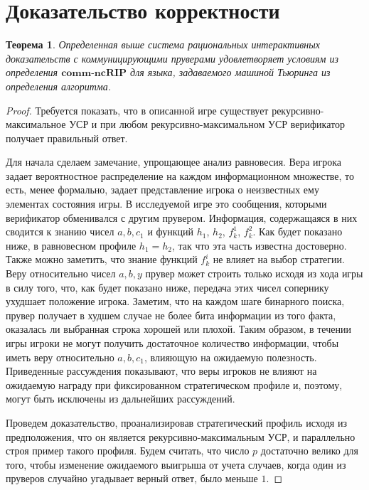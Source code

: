 \documentclass[14pt, a4paper]{extreport}
\newtheorem{theorem}{\indent Теорема}
\begin{document}
        \section{Доказательство корректности}
        \begin{theorem}Определенная выше система рациональных интерактивных доказательств с коммуницирующими пруверами удовлетворяет условиям из определения $\textbf{comm-ncRIP}$ для языка, задаваемого машиной Тьюринга из определения алгоритма.\end{theorem}
        \begin{proof}Требуется показать, что в описанной игре существует рекурсивно-максимальное УСР и при любом рекурсивно-максимальном УСР верификатор получает правильный ответ.

            Для начала сделаем замечание, упрощающее анализ равновесия. Вера игрока задает вероятностное распределение на каждом информационном множестве, то есть, менее формально, задает представление игрока о неизвестных ему элементах состояния игры. В исследуемой игре это сообщения, которыми верификатор обменивался с другим прувером. Информация, содержащаяся в них сводится к знанию чисел $a, b, c_1$ и функций $h_1$, $h_2$, $f^1_k$, $f^2_k$. Как будет показано ниже, в равновесном профиле $h_1 = h_2$, так что эта часть известна достоверно. Также можно заметить, что знание функций $f^i_k$ не влияет на выбор стратегии. Веру относительно чисел $a, b, y$ прувер может строить только исходя из хода игры в силу того, что, как будет показано ниже, передача этих чисел сопернику ухудшает положение игрока. Заметим, что на каждом шаге бинарного поиска, прувер получает в худшем случае не более бита информации из того факта, оказалась ли выбранная строка хорошей или плохой. Таким образом, в течении игры игроки не могут получить достаточное количество информации, чтобы иметь веру относительно $a, b, c_1$, влияющую на ожидаемую полезность. Приведенные рассуждения показывают, что веры игроков не влияют на ожидаемую награду при фиксированном стратегическом профиле и, поэтому, могут быть исключены из дальнейших рассуждений.

        Проведем доказательство, проанализировав стратегический профиль исходя из предположения, что он является рекурсивно-максимальным УСР, и параллельно строя пример такого профиля. Будем считать, что число $p$ достаточно велико для того, чтобы изменение ожидаемого выигрыша от учета случаев, когда один из пруверов случайно угадывает верный ответ, было меньше $1$.


\end{proof}
\end{document}
